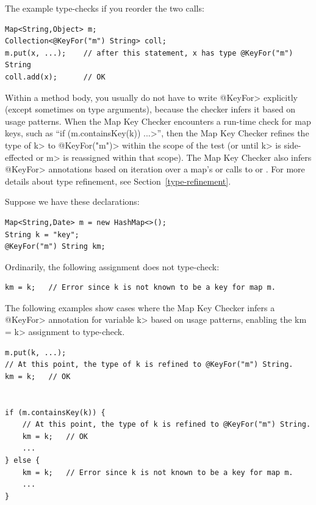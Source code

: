 \noindent
The example type-checks if you reorder the two calls:

\begin{verbatim}
Map<String,Object> m;
Collection<@KeyFor("m") String> coll;
m.put(x, ...);    // after this statement, x has type @KeyFor("m") String
coll.add(x);      // OK
\end{verbatim}




Within a method body, you usually do not have to write \<@KeyFor>
explicitly (except sometimes on type arguments),
because the checker infers it based on usage patterns.  When the Map Key
Checker encounters a run-time check for map keys, such as
``\<if (m.containsKey(k)) ...>'', then the Map Key Checker refines the type of
\<k> to \<@KeyFor("m")> within the scope of the test (or until \<k> is
side-effected or \<m> is reassigned within that scope).  The Map Key Checker also infers \<@KeyFor>
annotations based on iteration over a map's
 or calls to
or
.
For more details about type refinement, see Section~\ref{type-refinement}.

Suppose we have these declarations:

\begin{verbatim}
Map<String,Date> m = new HashMap<>();
String k = "key";
@KeyFor("m") String km;
\end{verbatim}

Ordinarily, the following assignment does not type-check:

\begin{verbatim}
km = k;   // Error since k is not known to be a key for map m.
\end{verbatim}

The following examples show cases where the Map Key Checker
infers a \<@KeyFor> annotation for variable \<k> based on usage patterns,
enabling the \<km = k> assignment to type-check.


\begin{verbatim}
m.put(k, ...);
// At this point, the type of k is refined to @KeyFor("m") String.
km = k;   // OK


if (m.containsKey(k)) {
    // At this point, the type of k is refined to @KeyFor("m") String.
    km = k;   // OK
    ...
} else {
    km = k;   // Error since k is not known to be a key for map m.
    ...
}
\end{verbatim}


